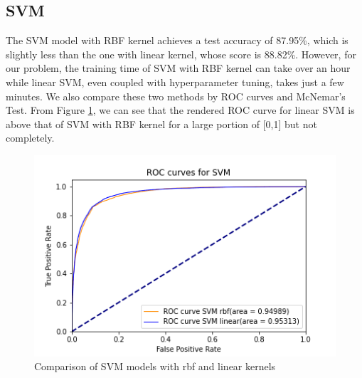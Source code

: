 \documentclass[10pt,twocolumn,letterpaper]{article}
\begin{document}
	\subsection{SVM}
	The SVM model with RBF kernel achieves a test accuracy of 87.95\%, which is slightly less than the one with linear kernel, whose score is 88.82\%. However, for our problem, the training time of SVM with RBF kernel can take over an hour while linear SVM, even coupled with hyperparameter tuning, takes just a few minutes. We also compare these two methods by ROC curves and McNemar's Test. From Figure \ref{ROC_SVM}, we can see that the rendered ROC curve for linear SVM is above that of SVM with RBF kernel for a large portion of [0,1] but not completely.  
	\begin{figure}[H]
		\includegraphics[width=\columnwidth]{ROC_SVM}
		\caption{Comparison of SVM models with rbf and linear kernels}\label{ROC_SVM}
	\end{figure} 
	
\end{document}
